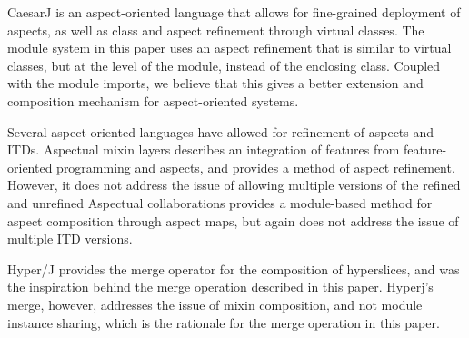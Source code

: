 CaesarJ\cite{caesarj} is an aspect-oriented language that allows for fine-grained deployment
of aspects, as well as class and aspect refinement through virtual classes\cite{virtualclasses89}. 
The module system in this paper uses an aspect refinement that is similar to virtual classes, but
at the level of the module, instead of the enclosing class. Coupled with the module imports,
we believe that this gives a better extension and composition mechanism for aspect-oriented systems.

Several aspect-oriented languages have allowed for refinement of aspects and ITDs. 
Aspectual mixin layers \cite{aspectualmixinlayers} describes an integration of features from
feature-oriented programming \cite{fopstepwiserefinement} and aspects, and provides a method of 
aspect refinement. However, it does not address the issue of allowing multiple versions of the refined and unrefined 
Aspectual collaborations \cite{lieberherr03aspectual} provides a module-based method for
aspect composition through aspect maps, but again does not address the issue of multiple
ITD versions.

Hyper/J \cite{hyperj} provides the merge operator for the composition of hyperslices, and was
the inspiration behind the merge operation described in this paper. Hyperj's merge, however, addresses
the issue of mixin composition, and not module instance sharing, which is the rationale for
the merge operation in this paper.


